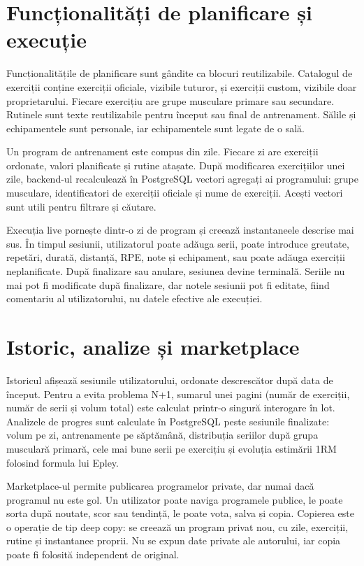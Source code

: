 \section{Funcționalități de planificare și execuție}

Funcționalitățile de planificare sunt gândite ca blocuri reutilizabile. Catalogul de exerciții conține
exerciții oficiale, vizibile tuturor, și exerciții custom, vizibile doar proprietarului. Fiecare
exercițiu are grupe musculare primare sau secundare. Rutinele sunt texte reutilizabile pentru început
sau final de antrenament. Sălile și echipamentele sunt personale, iar echipamentele sunt legate de o
sală.

Un program de antrenament este compus din zile. Fiecare zi are exerciții ordonate, valori planificate
și rutine atașate. După modificarea exercițiilor unei zile, backend-ul recalculează în PostgreSQL
vectori agregați ai programului: grupe musculare, identificatori de exerciții oficiale și nume de
exerciții. Acești vectori sunt utili pentru filtrare și căutare.

Execuția live pornește dintr-o zi de program și creează instantaneele descrise mai sus. În timpul
sesiunii, utilizatorul poate adăuga serii, poate introduce greutate, repetări, durată, distanță, RPE,
note și echipament, sau poate adăuga exerciții neplanificate. După finalizare sau anulare, sesiunea
devine terminală. Seriile nu mai pot fi modificate după finalizare, dar notele sesiunii pot fi editate,
fiind comentariu al utilizatorului, nu datele efective ale execuției.

\section{Istoric, analize și marketplace}

Istoricul afișează sesiunile utilizatorului, ordonate descrescător după data de început. Pentru a evita
problema N+1, sumarul unei pagini (număr de exerciții, număr de serii și volum total) este calculat
printr-o singură interogare în lot. Analizele de progres sunt calculate în PostgreSQL peste sesiunile
finalizate: volum pe zi, antrenamente pe săptămână, distribuția seriilor după grupa musculară primară,
cele mai bune serii pe exercițiu și evoluția estimării 1RM folosind formula lui Epley.

Marketplace-ul permite publicarea programelor private, dar numai dacă programul nu este gol. Un
utilizator poate naviga programele publice, le poate sorta după noutate, scor sau tendință, le poate
vota, salva și copia. Copierea este o operație de tip deep copy: se creează un program privat nou,
cu zile, exerciții, rutine și instantanee proprii. Nu se expun date private ale autorului, iar copia
poate fi folosită independent de original.

